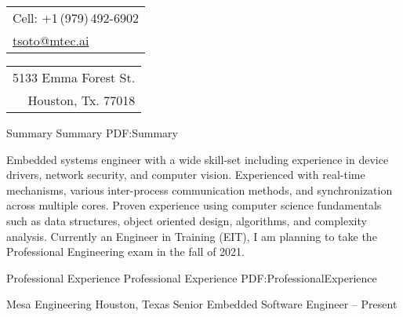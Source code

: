 \documentclass[letterpaper,MMMyyyy,nonstopmode]{simpleresumecv}
\newcommand{\CVAuthor}{Timothy Soto}
\begin{document}

\Title{\CVAuthor}

\noindent
\begin{tabular}[t]{@{}l}
    Cell: +1\,(979)\,492-6902 \\
    \href{mailto:tsoto@mtec.ai}
    {tsoto@mtec.ai}
\end{tabular}
\hfill%
\begin{tabular}[t]{r@{}}
    5133 Emma Forest St. \\ Houston, Tx. 77018
\end{tabular}

\begin{Body}
    \Entry



    \Section
    {Summary}
    {Summary}
    {PDF:Summary}



    Embedded systems engineer with a wide skill-set including experience in device drivers, network security, and computer vision. Experienced with real-time mechanisms, various inter-process communication methods, and synchronization across multiple cores. Proven experience using computer science fundamentals such as data structures, object oriented design, algorithms, and complexity analysis. Currently an Engineer in Training (EIT), I am planning to take the Professional Engineering exam in the fall of 2021.


    \Entry




    \Section
    {Professional Experience}
    {Professional Experience}
    {PDF:ProfessionalExperience}





    \SubSection
    {Mesa Engineering}
    {Houston, Texas}
    {Senior Embedded Software Engineer}
    { -- Present}


\end{Body}
\end{document}
